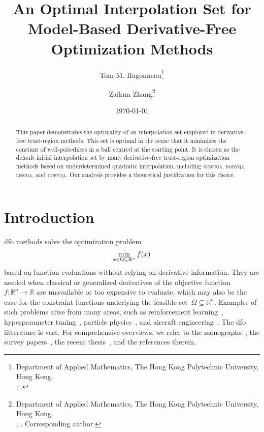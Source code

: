 \documentclass{article}
\title{An Optimal Interpolation Set for Model-Based Derivative-Free Optimization Methods}
\author{
    Tom M. Ragonneau\thanks{
        Department of Applied Mathematics, The Hong Kong Polytechnic University, Hong Kong.\\
        \email{tom.ragonneau@polyu.edu.hk}; \orcid{0000-0003-2717-2876}.
    } \and
    Zaikun Zhang\thanks{
        Department of Applied Mathematics, The Hong Kong Polytechnic University, Hong Kong.\\
        \email{zaikun.zhang@polyu.edu.hk}; \orcid{0000-0001-8934-8190}. Corresponding author.
    }
}
\date{\today}
\numberwithin{equation}{section}
\theoremstyle{definition}
\theoremstyle{plain}
\theoremstyle{remark}
\newcommand*{\fset}{\Omega}
\newcommand*{\obj}{f}
\newcommand*{\R}{\mathbb{R}}
\newcommand*{\solvername}[1]{\textsc{#1}\xspace}
\begin{document}
\maketitle

\begin{abstract}
    This paper demonstrates the optimality of an interpolation set employed in derivative-free trust-region methods.
    This set is optimal in the sense that it minimizes the constant of well-poisedness in a ball centred at the starting point.
    It is chosen as the default initial interpolation set by many derivative-free trust-region optimization methods based on underdetermined quadratic interpolation, including \solvername{newuoa}, \solvername{bobyqa}, \solvername{lincoa}, and \solvername{cobyqa}.
    Our analysis provides a theoretical justification for this choice.
\end{abstract}



\section{Introduction}

\Gls{dfo} methods solve the optimization problem
\begin{equation}
    \label{eq:nlp}
    \min_{x \in \fset \subseteq \R^n} \obj(x)\\
\end{equation}
based on function evaluations without relying on derivative information.
They are needed when classical or generalized derivatives of the objective function~$\obj \colon \R^n \to \R$ are unavailable or too expensive to evaluate, which may also be the case for the constraint functions underlying the feasible set~$\fset \subseteq \R^n$.
Examples of such problems arise from many areas, such as reinforcement learning~\cite{Qian_Yu_2021}, hyperparameter tuning~\cite{Ghanbari_Scheinberg_2017}, particle physics~\cite{Eldred_Etal_2022}, and aircraft engineering~\cite{Gazaix_Etal_2019}.
The \gls{dfo} litterature is vast. For comprehensive overviews, we refer to the monographs~\cite{Conn_Scheinberg_Vicente_2009,Audet_Hare_2017}, the survey papers~\cite{Powell_1975,Powell_1998,Rios_Sahinidis_2013,Custodio_Scheinberg_Vicente_2017,Larson_Menickelly_Wild_2019}, the recent thesis~\cite{Ragonneau_2022}, and the references therein.
\end{document}
